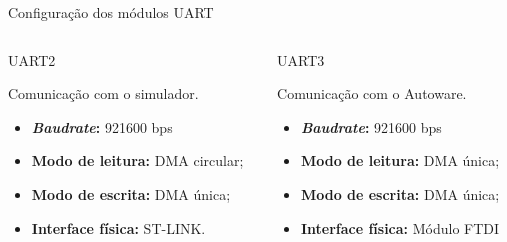 \documentclass{if-beamer}
\begin{document}
\begin{frame}{Configuração dos módulos UART}
	
	\begin{columns}
		
		\begin{column}{0.5\textwidth}
			
			\begin{block}{UART2}
				
				Comunicação com o simulador.
				\begin{itemize}
					\item \textbf{\textit{Baudrate}:} 921600 bps
					\item \textbf{Modo de leitura:} DMA circular;
					\item \textbf{Modo de escrita:} DMA única;
					\item \textbf{Interface física:} ST-LINK.
				\end{itemize}
				
			\end{block}
			
		\end{column}
	
\pause
		
		\begin{column}{0.5\textwidth}
			
			\begin{block}{UART3}
				
				Comunicação com o Autoware.
				\begin{itemize}
					\item \textbf{\textit{Baudrate}:} 921600 bps
					\item \textbf{Modo de leitura:} DMA única;
					\item \textbf{Modo de escrita:} DMA única;
					\item \textbf{Interface física:} Módulo FTDI			
				\end{itemize}
				
			\end{block}
			
		\end{column}
		
	\end{columns}
	
\end{frame}
\end{document}
